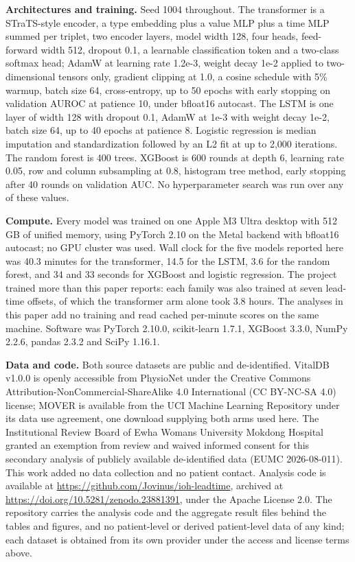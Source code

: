 \textbf{Architectures and training.} Seed 1004 throughout. The transformer is a STraTS-style
encoder, a type embedding plus a value MLP plus a time MLP summed per triplet, two encoder
layers, model width 128, four heads, feed-forward width 512, dropout 0.1, a learnable
classification token and a two-class softmax head; AdamW at learning rate 1.2e-3, weight
decay 1e-2 applied to two-dimensional tensors only, gradient clipping at 1.0, a cosine
schedule with 5\% warmup, batch size 64, cross-entropy, up to 50 epochs with early stopping on
validation AUROC at patience 10, under bfloat16 autocast. The LSTM is one layer of width 128
with dropout 0.1, AdamW at 1e-3 with weight decay 1e-2, batch size 64, up to 40 epochs at
patience 8. Logistic regression is median imputation and standardization followed by an L2
fit at up to 2,000 iterations. The random forest is 400 trees. XGBoost is 600 rounds at depth
6, learning rate 0.05, row and column subsampling at 0.8, histogram tree method, early
stopping after 40 rounds on validation AUC. No hyperparameter search was run over any of
these values.

\textbf{Compute.} Every model was trained on one Apple M3 Ultra desktop with 512 GB of unified
memory, using PyTorch 2.10 on the Metal backend with bfloat16 autocast; no GPU cluster was
used. Wall clock for the five models reported here was 40.3 minutes for the transformer, 14.5
for the LSTM, 3.6 for the random forest, and 34 and 33 seconds for XGBoost and logistic
regression. The project trained more than this paper reports: each family was also trained at
seven lead-time offsets, of which the transformer arm alone took 3.8 hours. The analyses in
this paper add no training and read cached per-minute scores on the same machine. Software
was PyTorch 2.10.0, scikit-learn 1.7.1, XGBoost 3.3.0, NumPy
2.2.6, pandas 2.3.2 and SciPy 1.16.1.

\textbf{Data and code.} Both source datasets are public and de-identified. VitalDB v1.0.0 is openly accessible from PhysioNet under the Creative Commons Attribution-NonCommercial-ShareAlike 4.0 International (CC BY-NC-SA 4.0) license; MOVER is available from the UCI Machine Learning Repository under its data use agreement, one download supplying both arms used here. The Institutional Review Board of Ewha Womans University Mokdong Hospital granted an exemption from review and waived informed consent for this secondary analysis of publicly available
de-identified data (EUMC 2026-08-011). This work
added no data collection and no patient contact. Analysis code is available at \url{https://github.com/Jovinus/ioh-leadtime}, archived at
\url{https://doi.org/10.5281/zenodo.23881391}, under the Apache License 2.0.
The repository carries the analysis code and the aggregate result files behind the tables and figures, and no patient-level or derived patient-level data of any kind; each dataset is obtained from its own provider under the access and license terms above.

